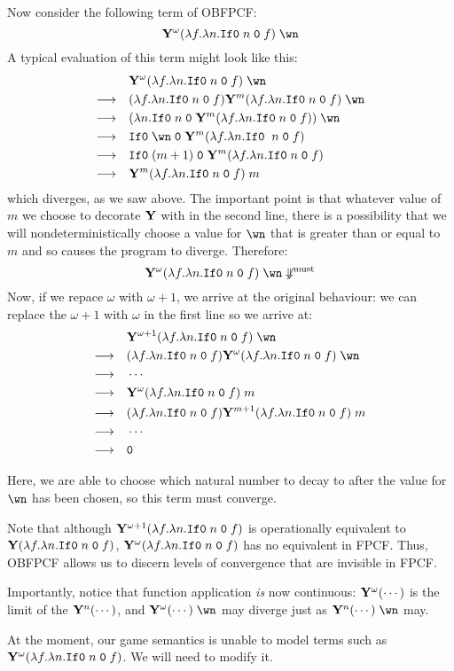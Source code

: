 \documentclass{article}
\begin{document}
\begin{example}
  Now consider the following term of OBFPCF:
  \[
    \Y^\omega (\lambda f.\lambda n.\IfO n\;\0\;f)\;\wn
    \]
  A typical evaluation of this term might look like this:
  \begin{align*}
    & \Y^\omega (\lambda f.\lambda n.\IfO n\;\0\;f)\;\wn \\
    \opto\quad & (\lambda f.\lambda n.\IfO n\;\0\;f) \Y^m (\lambda f.\lambda n.\IfO n\;\0\;f)\;\wn \\
    \opto\quad & (\lambda n.\IfO n \;\0 \;\Y^m (\lambda f.\lambda n.\IfO n\;\0\;f))\;\wn \\
    \opto\quad & \IfO \wn\;\0\;\Y^m(\lambda f.\lambda n.\IfO\;n\;\0\;f) \\
    \opto\quad & \IfO (m+1)\;\0\;\Y^m(\lambda f.\lambda n.\IfO n\;\0\;f) \\
    \opto\quad & \Y^m(\lambda f.\lambda n.\IfO n\;\0\;f) \;m
  \end{align*}
  which diverges, as we saw above.  The important point is that whatever value of $m$ we choose to decorate $\mathbf{Y}$ with in the second line, there is a possibility that we will nondeterministically choose a value for $\wn$ that is greater than or equal to $m$ and so causes the program to diverge.  Therefore:
  \[
    \Y^\omega (\lambda f.\lambda n.\IfO n\;\0\;f)\;\wn\not\mustconverge
    \]
  Now, if we repace $\omega$ with $\omega+1$, we arrive at the original behaviour: we can replace the $\omega+1$ with $\omega$ in the first line so we arrive at:
  \begin{align*}
    & \Y^{\omega+1} (\lambda f.\lambda n.\IfO n\;\0\;f)\;\wn \\
    \opto\quad & (\lambda f.\lambda n.\IfO n\;\0\;f) \Y^\omega (\lambda f.\lambda n.\IfO n\;\0\;f)\;\wn \\
    \opto\quad & \cdots \\
    \opto\quad & \Y^\omega(\lambda f.\lambda n.\IfO n\;\0\;f) \;m \\
    \opto\quad & (\lambda f.\lambda n.\IfO n\;\0\;f) \Y^{m+1}(\lambda f.\lambda n.\IfO n\;\0\;f) \;m \\
    \opto\quad & \cdots \\
    \opto\quad & \0
  \end{align*}

Here, we are able to choose which natural number to decay to after the value for $\wn$ has been chosen, so this term must converge.

Note that although $\mathbf{Y}^{\omega+1}(\lambda f.\lambda n.{\mathtt{If0}\;} n\;{\mathtt{0}}\;f)$ is operationally equivalent to $\mathbf{Y}(\lambda f.\lambda n.{\mathtt{If0}\;} n\;{\mathtt{0}}\;f)$, $\mathbf{Y}^\omega(\lambda f.\lambda n.{\mathtt{If0}\;} n\;{\mathtt{0}}\;f)$ has no equivalent in FPCF.  Thus, OBFPCF allows us to discern levels of convergence that are invisible in FPCF.

  Importantly, notice that function application \emph{is} now continuous: $\mathbf{Y}^\omega(\cdots)$ is the limit of the $\mathbf{Y}^n(\cdots)$, and $\Y^\omega(\cdots)\;\wn$ may diverge just as $\Y^n(\cdots)\;\wn$ may.

  At the moment, our game semantics is unable to model terms such as $\mathbf{Y}^\omega(\lambda f.\lambda n.{\mathtt{If0}\;} n\;{\mathtt{0}}\;f)$.  We will need to modify it.
\end{example}
\end{document}
